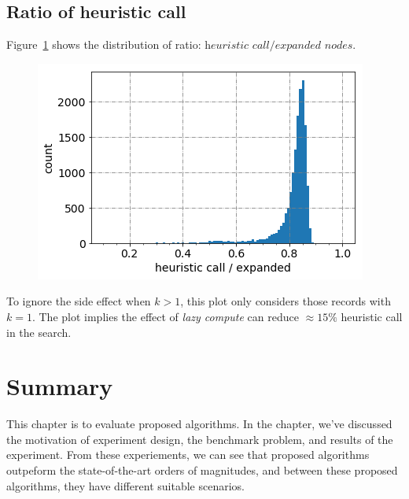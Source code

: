 \subsection{Ratio of heuristic call}
Figure~\ref{lazy_compute} shows the distribution of ratio:
$\textit{heuristic call} / \textit{expanded nodes}$.
\begin{figure}[!htp]
  \centering
  \includegraphics[width=.5\linewidth]{./pic/lazy_compute.png}
  \caption{}
  \label{lazy_compute}
\end{figure}
To ignore the side effect when $k>1$, this plot only considers those records with $k=1$.
The plot implies the effect of \textit{lazy compute} can reduce $\approx 15\%$ heuristic call in
the search.

\section{Summary}
This chapter is to evaluate proposed algorithms.
In the chapter, we've discussed the motivation of experiment design,
the benchmark problem, and results of the experiment.
From these experiements, we can see that proposed algorithms outpeform the state-of-the-art
orders of magnitudes, and between these proposed algorithms, they have different suitable
scenarios.
